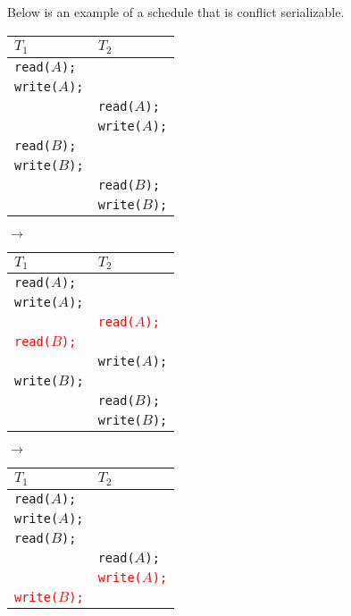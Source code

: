\documentclass{report}
\newenvironment{example}{\begin{tcolorbox}[title={Example},colback=green!5!white,colframe=black!75!green]}{\end{tcolorbox}}
\renewcommand{\tt}[1]{\texttt{{#1}}}
\begin{document}
\begin{example}
    Below is an example of a schedule that is conflict serializable.

    {
        \centering
        \begin{tabular}{l|l}
            $T_1$ & $T_2$ \\
            \hline
            \tt{read($A$);} & \\
            \tt{write($A$);} & \\
                             & \tt{read($A$);} \\
                             & \tt{write($A$);} \\
            \tt{read($B$);} & \\
            \tt{write($B$);} & \\
                             & \tt{read($B$);} \\
                             & \tt{write($B$);} \\
        \end{tabular}
        $\to$
        \begin{tabular}{l|l}
            $T_1$ & $T_2$ \\
            \hline
            \tt{read($A$);} & \\
            \tt{write($A$);} & \\
                             & \tt{\textcolor{red}{read($A$);}} \\
            \tt{\textcolor{red}{read($B$);}} & \\
                                             & \tt{write($A$);} \\
            \tt{write($B$);} & \\
                             & \tt{read($B$);} \\
                             & \tt{write($B$);} \\
        \end{tabular}
        $\to$
        \begin{tabular}{l|l}
            $T_1$ & $T_2$ \\
            \hline
            \tt{read($A$);} & \\
            \tt{write($A$);} & \\
            \tt{read($B$);} & \\
                            & \tt{read($A$);} \\
                            & \tt{\textcolor{red}{write($A$);}} \\
            \tt{\textcolor{red}{write($B$);}} & \\

\end{tabular}}
\end{example}
\end{document}
